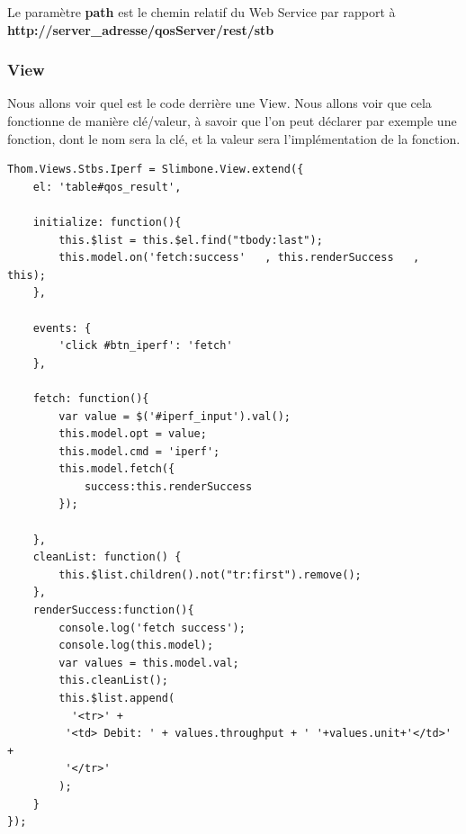 Le paramètre \textbf{path} est le chemin relatif du Web Service par rapport à \textbf{http://server\_adresse/qosServer/rest/stb}

\subsubsection{View}
Nous allons voir quel est le code derrière une View. Nous allons voir que cela fonctionne de manière clé/valeur, à savoir que l'on peut déclarer par exemple une fonction, dont le nom sera la clé, et la valeur sera l'implémentation de la fonction.
\begin{lstlisting}[caption={Code de la View}]
Thom.Views.Stbs.Iperf = Slimbone.View.extend({
	el: 'table#qos_result',

	initialize: function(){
		this.$list = this.$el.find("tbody:last");
		this.model.on('fetch:success'   , this.renderSuccess   , this);
	},

	events: {
		'click #btn_iperf': 'fetch'
	},

	fetch: function(){
		var value = $('#iperf_input').val();
		this.model.opt = value;
		this.model.cmd = 'iperf';
		this.model.fetch({
			success:this.renderSuccess
		});

	},
	cleanList: function() {
    	this.$list.children().not("tr:first").remove();
  	},
	renderSuccess:function(){
		console.log('fetch success');
		console.log(this.model);
		var values = this.model.val;
		this.cleanList();
        this.$list.append(
          '<tr>' +
		 '<td> Debit: ' + values.throughput + ' '+values.unit+'</td>' +
		 '</tr>'
        );
	}
});
\end{lstlisting}

